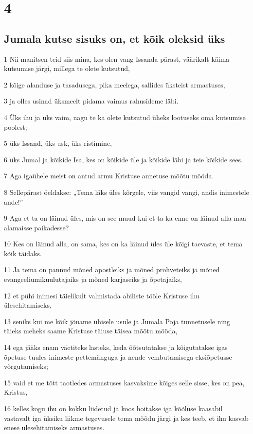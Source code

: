 \chapter{4}

\section*{Jumala kutse sisuks on, et kõik oleksid üks}

\par 1 Nii manitsen teid siis mina, kes olen vang Issanda pärast, väärikalt käima kutsumise järgi, millega te olete kutsutud,
\par 2 kõige alanduse ja tasadusega, pika meelega, sallides üksteist armastuses,
\par 3 ja olles usinad üksmeelt pidama vaimus rahusideme läbi.
\par 4 Üks ihu ja üks vaim, nagu te ka olete kutsutud üheks lootuseks oma kutsumise poolest;
\par 5 üks Issand, üks usk, üks ristimine,
\par 6 üks Jumal ja kõikide Isa, kes on kõikide üle ja kõikide läbi ja teie kõikide sees.
\par 7 Aga igaühele meist on antud armu Kristuse annetuse mõõtu mööda.
\par 8 Sellepärast öeldakse: „Tema läks üles kõrgele, viis vangid vangi, andis inimestele ande!”
\par 9 Aga et ta on läinud üles, mis on see muud kui et ta ka enne on läinud alla maa alamaisse paikadesse?
\par 10 Kes on läinud alla, on sama, kes on ka läinud üles üle kõigi taevaste, et tema kõik täidaks.
\par 11 Ja tema on pannud mõned apostleiks ja mõned prohveteiks ja mõned evangeeliumikuulutajaiks ja mõned karjaseiks ja õpetajaiks,
\par 12 et pühi inimesi täielikult valmistada abiliste tööle Kristuse ihu ülesehitamiseks,
\par 13 seniks kui me kõik jõuame ühisele usule ja Jumala Poja tunnetusele ning täieks meheks saame Kristuse täiuse täisea mõõtu mööda,
\par 14 ega jääks enam väetiteks lasteks, keda õõtsutatakse ja kõigutatakse igas õpetuse tuules inimeste pettemänguga ja nende vembutamisega eksiõpetusse võrgutamiseks;
\par 15 vaid et me tõtt taotledes armastuses kasvaksime kõiges selle sisse, kes on pea, Kristus,
\par 16 kelles kogu ihu on kokku liidetud ja koos hoitakse iga kõõluse kaasabil vastavalt iga üksiku liikme tegevusele tema mõõdu järgi ja kes teeb, et ihu kasvab enese ülesehitamiseks armastuses.

